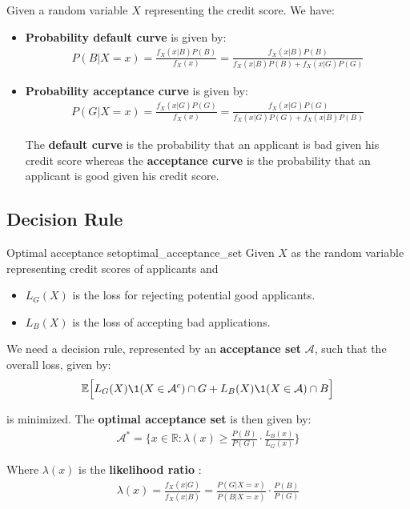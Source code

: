 \begin{definition}
    Given a random variable $X$ representing the credit score. We have:
    \begin{itemize}
        \item \textbf{Probability default curve} is given by:
        \begin{align*}
            P(B|X=x) = \frac{f_X(x|B)P(B)}{f_X(x)} = \frac{f_X(x|B)P(B)}{f_X(x|B)P(B) + f_X(x|G)P(G)}
        \end{align*}

        \item \textbf{Probability acceptance curve} is given by:
        \begin{align*}
            P(G|X=x) = \frac{f_X(x|G)P(G)}{f_X(x)} = \frac{f_X(x|G)P(G)}{f_X(x|G)P(G) + f_X(x|B)P(B)}
        \end{align*}

        \noindent The \textbf{default curve} is the probability that an applicant is bad given his credit score whereas the \textbf{acceptance curve} is the probability that an applicant is good given his credit score.
    \end{itemize}
\end{definition}

\subsection{Decision Rule}
\begin{theorem}{Optimal acceptance set}{optimal_acceptance_set}
    Given $X$ as the random variable representing credit scores of applicants and 
    \begin{itemize}
        \item $L_G(X)$ is the loss for rejecting potential good applicants.
        \item $L_B(X)$ is the loss of accepting bad applications.
    \end{itemize}

    \noindent We need a decision rule, represented by an \textbf{acceptance set} $\mathcal{A}$, such that the overall loss, given by:
    \begin{align*}
        \mathbb{E}\Big[ L_G(X)\1{(X \in \mathcal{A}^c)\cap G} + L_B(X)\1{(X\in\mathcal{A})\cap B} \Big]
    \end{align*}

    \noindent is minimized. The \textbf{optimal acceptance set} is then given by:
    \begin{align*}
        \boxed{
            \mathcal{A}^* = \Bigg\{ 
                x \in \mathbb{R} : \lambda(x) \ge \frac{P(B)}{P(G)}\cdot \frac{L_B(x)}{L_G(x)} 
            \Bigg\}
        }
    \end{align*}

    \noindent Where $\lambda(x)$ is the \textbf{likelihood ratio} : 
    \begin{align*}
        \lambda(x) = \frac{f_X(x|G)}{f_X(x|B)} = \frac{P(G|X=x)}{P(B|X=x)}\cdot\frac{P(B)}{P(G)}
    \end{align*}
\end{theorem}

